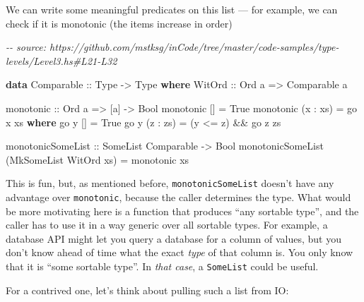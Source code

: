 \documentclass[]{article}
\newenvironment{Shaded}{}{}
\newcommand{\CommentTok}[1]{\textcolor[rgb]{0.38,0.63,0.69}{\textit{#1}}}
\newcommand{\DataTypeTok}[1]{\textcolor[rgb]{0.56,0.13,0.00}{#1}}
\newcommand{\KeywordTok}[1]{\textcolor[rgb]{0.00,0.44,0.13}{\textbf{#1}}}
\newcommand{\NormalTok}[1]{#1}
\newcommand{\OperatorTok}[1]{\textcolor[rgb]{0.40,0.40,0.40}{#1}}
\newcommand{\OtherTok}[1]{\textcolor[rgb]{0.00,0.44,0.13}{#1}}
\begin{document}
We can write some meaningful predicates on this list --- for example, we can
check if it is monotonic (the items increase in order)

\begin{Shaded}
\begin{Highlighting}[]
\CommentTok{{-}{-} source: https://github.com/mstksg/inCode/tree/master/code{-}samples/type{-}levels/Level3.hs\#L21{-}L32}

\KeywordTok{data} \DataTypeTok{Comparable}\OtherTok{ ::} \DataTypeTok{Type} \OtherTok{{-}\textgreater{}} \DataTypeTok{Type} \KeywordTok{where}
  \DataTypeTok{WitOrd}\OtherTok{ ::} \DataTypeTok{Ord}\NormalTok{ a }\OtherTok{=\textgreater{}} \DataTypeTok{Comparable}\NormalTok{ a}

\OtherTok{monotonic ::} \DataTypeTok{Ord}\NormalTok{ a }\OtherTok{=\textgreater{}}\NormalTok{ [a] }\OtherTok{{-}\textgreater{}} \DataTypeTok{Bool}
\NormalTok{monotonic [] }\OtherTok{=} \DataTypeTok{True}
\NormalTok{monotonic (x }\OperatorTok{:}\NormalTok{ xs) }\OtherTok{=}\NormalTok{ go x xs}
  \KeywordTok{where}
\NormalTok{    go y [] }\OtherTok{=} \DataTypeTok{True}
\NormalTok{    go y (z }\OperatorTok{:}\NormalTok{ zs) }\OtherTok{=}\NormalTok{ (y }\OperatorTok{\textless{}=}\NormalTok{ z) }\OperatorTok{\&\&}\NormalTok{ go z zs}

\OtherTok{monotonicSomeList ::} \DataTypeTok{SomeList} \DataTypeTok{Comparable} \OtherTok{{-}\textgreater{}} \DataTypeTok{Bool}
\NormalTok{monotonicSomeList (}\DataTypeTok{MkSomeList} \DataTypeTok{WitOrd}\NormalTok{ xs) }\OtherTok{=}\NormalTok{ monotonic xs}
\end{Highlighting}
\end{Shaded}

This is fun, but, as mentioned before, \texttt{monotonicSomeList} doesn't have
any advantage over \texttt{monotonic}, because the caller determines the type.
What would be more motivating here is a function that produces ``any sortable
type'', and the caller has to use it in a way generic over all sortable types.
For example, a database API might let you query a database for a column of
values, but you don't know ahead of time what the exact \emph{type} of that
column is. You only know that it is ``some sortable type''. In \emph{that case},
a \texttt{SomeList} could be useful.

For a contrived one, let's think about pulling such a list from IO:
\end{document}
